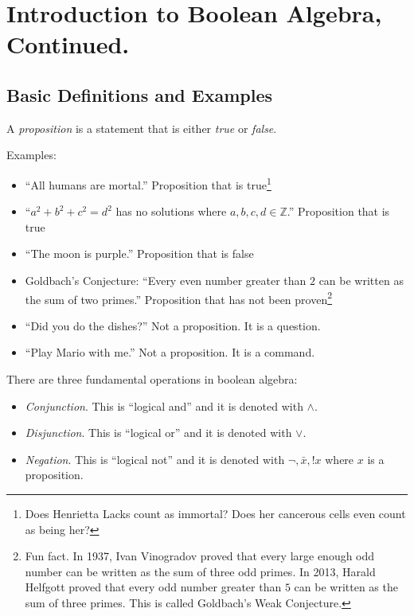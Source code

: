 
\section{Introduction to Boolean Algebra, Continued.}

\subsection{Basic Definitions and Examples}

\begin{definition}
    A \emph{proposition} is a statement that is either \emph{true} or \emph{false}.
\end{definition}

Examples:
\begin{itemize}
    \item ``All humans are mortal.'' Proposition that is true\footnote{Does Henrietta Lacks count as immortal? Does her cancerous cells even count as being her?}
    \item ``\(a^2+b^2+c^2=d^2\) has no solutions where \(a,b,c,d\in\mathbb{Z}\).'' Proposition that is true
    \item ``The moon is purple.'' Proposition that is false
    \item Goldbach's Conjecture: ``Every even number greater than \(2\) can be written as the sum of two primes.'' 
    Proposition that has not been proven\footnote{Fun fact. In 1937, Ivan Vinogradov proved that every large enough
    odd number can be written as the sum of three odd primes. In 2013, Harald Helfgott proved that every odd number greater than \(5\)
    can be written as the sum of three primes. This is called Goldbach's Weak Conjecture.}
    \item ``Did you do the dishes?'' Not a proposition. It is a question.
    \item ``Play Mario with me.'' Not a proposition. It is a command.
\end{itemize}

There are three fundamental operations in boolean algebra:
\begin{itemize}
    \item \emph{Conjunction}. This is ``logical and'' and it is denoted with \(\land\).
    \item \emph{Disjunction}. This is ``logical or'' and it is denoted with \(\lor\).
    \item \emph{Negation}. This is ``logical not'' and it is denoted with \(\lnot, \bar{x}, !x\) where \(x\) is a proposition.
\end{itemize}

